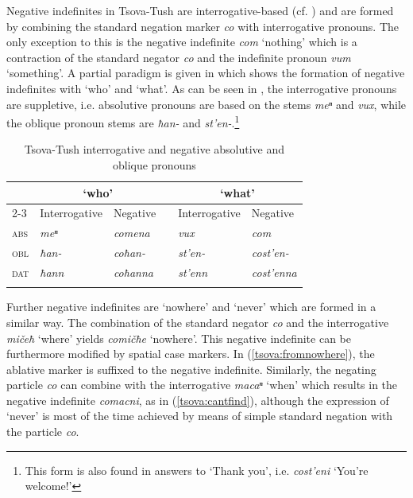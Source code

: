 \documentclass[output=paper,%
colorlinks,citecolor=brown,
showindex
]{langscibook}
\begin{document}
Negative indefinites in Tsova-Tush are interrogative-based (cf. \citealt{Haspelmath1997,Haspelmath2013-wals46}) and are formed by combining the standard negation marker \textit{co} with interrogative pronouns. The only exception to this is the negative indefinite \textit{com} `nothing' which is a contraction of the standard negator  \textit{co} and the indefinite pronoun \textit{vum} `something'. A partial paradigm is given in  which shows the formation of negative indefinites with `who' and `what'. As can be seen in , the interrogative pronouns are suppletive, i.e. absolutive pronouns are based on the stems \textit{meⁿ} and \textit{vux}, while the oblique pronoun stems are \textit{ħan-} and \textit{st'en-}.\footnote{This form is also found in answers to `Thank you', i.e. \textit{cost'eni} `You're welcome!'}

\begin{table}
\caption{Tsova-Tush interrogative and negative absolutive and oblique pronouns}
\label{tsova:tab:pron}
\begin{tabular}{@{}llllll@{}}
\lsptoprule
             & \multicolumn{2}{c}{`who'}       &  & \multicolumn{2}{c}{`what'}          \\
             \cmidrule{2-3}\cmidrule{5-6}
             & Interrogative & Negative        &  & Interrogative   & Negative          \\
             \midrule
\textsc{abs} & \textit{meⁿ}  & \textit{comena} &  & \textit{vux}    & \textit{com}      \\
\textsc{obl} & \textit{ħan-} & \textit{coħan-} &  & \textit{st'en-} & \textit{cost'en-} \\
\textsc{dat} &	 \textit{ħann} & \textit{coħanna} &  & \textit{st'enn} & \textit{cost'enna} \\
\lspbottomrule
\end{tabular}
\end{table}

Further negative indefinites are `nowhere' and `never' which are formed in a similar way. The combination of the standard negator \textit{co} and the interrogative \textit{mičeħ} `where' yields \textit{comičħe} `nowhere'. This negative indefinite can be furthermore modified by spatial case markers. In (\ref{tsova:fromnowhere}), the ablative marker is suffixed to the negative indefinite. Similarly, the negating particle \textit{co} can combine with the interrogative \textit{macaⁿ} `when' which results in the negative indefinite  \textit{comacni}, as in (\ref{tsova:cantfind}), although the expression of  `never' is most of the time achieved by means of simple standard negation with the particle \textit{co}. 
\end{document}

